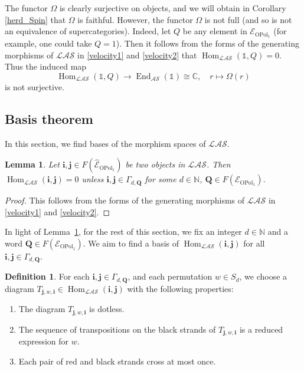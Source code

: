 \documentclass[11pt]{amsart}
\newtheorem{lem}[theo]{Lemma}
\theoremstyle{definition}
\newtheorem{defn}[theo]{Definition}
\numberwithin{equation}{section}
\begin{document}
The functor $ \Omega $ is clearly surjective on objects, and we will obtain in Corollary \ref{herd_Spin} that $ \Omega $ is faithful. However, the functor $ \Omega $ is not full (and so is not an equivalence of supercategories). Indeed, let $ Q $ be any element in $ \mathcal{E}_{\operatorname{OPol}_{1}} $ (for example, one could take $ Q = 1 $). Then it follows from the forms of the generating morphisms of $ \mathcal{LAS} $ in \cref{velocity1} and \cref{velocity2} that $ \operatorname{Hom}_{\mathcal{LAS}}(\mathds{1},Q) = 0 $. Thus the induced map
\begin{equation*}
\operatorname{Hom}_{\mathcal{LAS}}(\mathds{1},Q) \rightarrow \operatorname{End}_{\mathcal{AS}}(\mathds{1}) \cong \mathbb{C}, \quad r \mapsto \Omega(r)
\end{equation*}
is not surjective.


\subsection{Basis theorem} \label{keeper}

In this section, we find bases of the morphism spaces of $ \mathcal{LAS} $. 

\begin{lem} \label{checkmate}
Let $ \mathbf{i}, \mathbf{j} \in F(\widehat{\mathcal{E}}_{\operatorname{OPol}_{1}}) $ be two objects in $ \mathcal{LAS} $. Then $ \operatorname{Hom}_{\mathcal{LAS}}(\mathbf{i},\mathbf{j}) = 0 $ unless $ \mathbf{i}, \mathbf{j} \in \Gamma_{d,\mathbf{Q}} $ for some $ d \in \mathbb{N} $, $ \mathbf{Q} \in F(\mathcal{E}_{\operatorname{OPol}_{1}}) $.
\end{lem}

\begin{proof}
This follows from the forms of the generating morphisms of $ \mathcal{LAS} $ in \cref{velocity1} and \cref{velocity2}.
\end{proof}

In light of Lemma~\ref{checkmate}, for the rest of this section, we fix an integer $ d \in \mathbb{N} $ and a word $ \mathbf{Q} \in F(\mathcal{E}_{\operatorname{OPol}_{1}}) $. We aim to find a basis of $ \operatorname{Hom}_{\mathcal{LAS}}(\mathbf{i}, \mathbf{j}) $ for all $ \mathbf{i}, \mathbf{j} \in \Gamma_{d,\mathbf{Q}} $.

\begin{defn} \label{Generalized_crossings}
For each $ \mathbf{i}, \mathbf{j} \in \Gamma_{d,\mathbf{Q}} $, and each permutation $ w \in S_{d} $, we choose a diagram $ T_{\mathbf{j},w,\mathbf{i}} \in \operatorname{Hom}_{\mathcal{LAS}}(\mathbf{i}, \mathbf{j}) $ with the following properties:
\begin{enumerate}
\item[\textbullet] The diagram $ T_{\mathbf{j},w,\mathbf{i}} $ is dotless.
\item[\textbullet]  The sequence of transpositions on the black strands of $ T_{\mathbf{j},w,\mathbf{i}} $ is a reduced expression for \(w\). 
\item[\textbullet] Each pair of red and black strands cross at most once.
\end{enumerate}
\end{defn}
\end{document}

